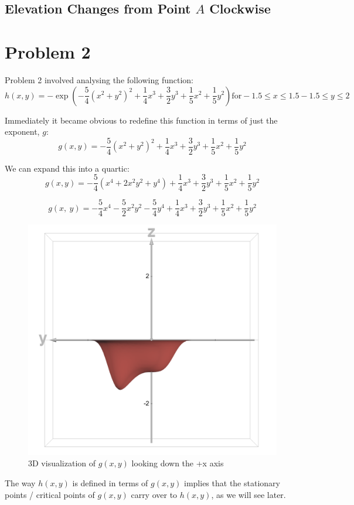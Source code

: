 \documentclass{article}
\begin{document}
\subsection{Elevation Changes from Point $A$ Clockwise}

\section {Problem 2}
Problem 2 involved analysing the following function:
\[
h \left(x, y\right) = - \exp \left(- \frac{5}{4} \left(x^{2}+y^{2}\right)^{2}+\frac{1}{4}x^{3}+\frac{3}{2}y^{3}+\frac{1}{5}x^{2}+\frac{1}{5}y^{2}\right)
\text{for}
-1.5 \le x \le 1.5
-1.5 \le y \le 2
\]

Immediately it became obvious to redefine this function in terms of just the exponent, $g$:
\[
g\left(x, y\right)=-\frac{5}{4}\left(x^{2}+y^{2}\right)^{2}+\frac{1}{4}x^{3}+\frac{3}{2}y^{3}+\frac{1}{5}x^{2}+\frac{1}{5}y^{2}
\]

We can expand this into a quartic:
\[
g\left(x, y\right)=-\frac{5}{4}\left(x^{4}+2x^{2}y^{2}+y^{4}\right)+\frac{1}{4}x^{3}+\frac{3}{2}y^{3}+\frac{1}{5}x^{2}+\frac{1}{5}y^{2}
\]

\[
g\left(x,\ y\right)=-\frac{5}{4}x^{4}-\frac{5}{2}x^{2}y^{2}-\frac{5}{4}y^{4}+\frac{1}{4}x^{3}+\frac{3}{2}y^{3}+\frac{1}{5}x^{2}+\frac{1}{5}y^{2}
\]

\begin{figure}[h]
    \centering
    \includegraphics[width=0.25\linewidth]{Topography 1.png}
    \caption{3D visualization of $g(x,y)$ looking down the +x axis}
    \label{fig:topography-v1}
\end{figure}


The way $h(x,y)$ is defined in terms of $g(x,y)$ implies that the stationary points / critical points of $g(x,y)$ carry over to $h(x, y)$, as we will see later.
\end{document}
